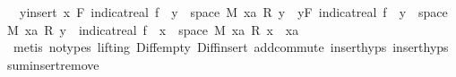 \begin{isabellebody}
\ {\isacharasterisk}{\kern0pt}{\isacharcolon}{\kern0pt}\ {\isachardoublequoteopen}{\isacharparenleft}{\kern0pt}{\isasymSum}y{\isasymin}insert\ x\ F{\isachardot}{\kern0pt}\ indicat{\isacharunderscore}{\kern0pt}real\ {\isacharparenleft}{\kern0pt}f\ {\isacharminus}{\kern0pt}{\isacharbackquote}{\kern0pt}\ {\isacharbraceleft}{\kern0pt}y{\isacharbraceright}{\kern0pt}\ {\isasyminter}\ space\ M{\isacharparenright}{\kern0pt}\ xa\ {\isacharasterisk}{\kern0pt}\isactrlsub R\ y{\isacharparenright}{\kern0pt}\ {\isacharequal}{\kern0pt}\ {\isacharparenleft}{\kern0pt}{\isasymSum}y{\isasymin}F{\isachardot}{\kern0pt}\ indicat{\isacharunderscore}{\kern0pt}real\ {\isacharparenleft}{\kern0pt}f\ {\isacharminus}{\kern0pt}{\isacharbackquote}{\kern0pt}\ {\isacharbraceleft}{\kern0pt}y{\isacharbraceright}{\kern0pt}\ {\isasyminter}\ space\ M{\isacharparenright}{\kern0pt}\ xa\ {\isacharasterisk}{\kern0pt}\isactrlsub R\ y{\isacharparenright}{\kern0pt}\ {\isacharplus}{\kern0pt}\ indicat{\isacharunderscore}{\kern0pt}real\ {\isacharparenleft}{\kern0pt}f\ {\isacharminus}{\kern0pt}{\isacharbackquote}{\kern0pt}\ {\isacharbraceleft}{\kern0pt}x{\isacharbraceright}{\kern0pt}\ {\isasyminter}\ space\ M{\isacharparenright}{\kern0pt}\ xa\ {\isacharasterisk}{\kern0pt}\isactrlsub R\ x{\isachardoublequoteclose}\ \ xa\ \isamarkupfalse%
\ {\isacharparenleft}{\kern0pt}metis\ {\isacharparenleft}{\kern0pt}no{\isacharunderscore}{\kern0pt}types{\isacharcomma}{\kern0pt}\ lifting{\isacharparenright}{\kern0pt}\ Diff{\isacharunderscore}{\kern0pt}empty\ Diff{\isacharunderscore}{\kern0pt}insert{}\ add{\isachardot}{\kern0pt}commute\ insert{\isachardot}{\kern0pt}hyps{\isacharparenleft}{\kern0pt}{}{\isacharparenright}{\kern0pt}\ insert{\isachardot}{\kern0pt}hyps{\isacharparenleft}{\kern0pt}{}{\isacharparenright}{\kern0pt}\ sum{\isachardot}{\kern0pt}insert{\isacharunderscore}{\kern0pt}remove{\isacharparenright}{\kern0pt}\isanewline
\ \ \ \ \isamarkupfalse%

\end{isabellebody}
